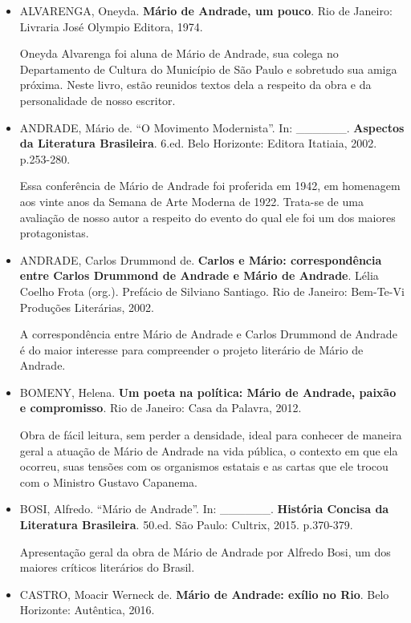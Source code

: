\documentclass[11pt]{extarticle}
\begin{document}
\begin{itemize}
\item  ALVARENGA, Oneyda. \textbf{Mário de Andrade, um pouco}. Rio de Janeiro:
Livraria José Olympio Editora, 1974.

Oneyda Alvarenga foi aluna de Mário de Andrade, sua colega no
Departamento de Cultura do Município de São Paulo e sobretudo sua amiga
próxima. Neste livro, estão reunidos textos dela a respeito da obra e da
personalidade de nosso escritor.

\item ANDRADE, Mário de. ``O Movimento Modernista''. In: \_\_\_\_\_\_.
\textbf{Aspectos da Literatura Brasileira}. 6.ed. Belo Horizonte:
Editora Itatiaia, 2002. p.253-280.

Essa conferência de Mário de Andrade foi proferida em 1942, em homenagem
aos vinte anos da Semana de Arte Moderna de 1922. Trata-se de uma
avaliação de nosso autor a respeito do evento do qual ele foi um dos
maiores protagonistas.

\item ANDRADE, Carlos Drummond de. \textbf{Carlos e Mário: correspondência
entre Carlos Drummond de Andrade e Mário de Andrade}. Lélia Coelho Frota
(org.). Prefácio de Silviano Santiago. Rio de Janeiro: Bem-Te-Vi
Produções Literárias, 2002.

A correspondência entre Mário de Andrade e Carlos Drummond de Andrade é
do maior interesse para compreender o projeto literário de Mário de
Andrade.

\item BOMENY, Helena. \textbf{Um poeta na política: Mário de Andrade, paixão e
compromisso}. Rio de Janeiro: Casa da Palavra, 2012.

Obra de fácil leitura, sem perder a densidade, ideal para conhecer de
maneira geral a atuação de Mário de Andrade na vida pública, o contexto
em que ela ocorreu, suas tensões com os organismos estatais e as cartas
que ele trocou com o Ministro Gustavo Capanema.

\item BOSI, Alfredo. ``Mário de Andrade''. In: \_\_\_\_\_\_. \textbf{História
Concisa da Literatura Brasileira}. 50.ed. São Paulo: Cultrix, 2015.
p.370-379.

Apresentação geral da obra de Mário de Andrade por Alfredo Bosi, um dos
maiores críticos literários do Brasil.

\item CASTRO, Moacir Werneck de. \textbf{Mário de Andrade: exílio no Rio}.
Belo Horizonte: Autêntica, 2016.


\end{itemize}
\end{document}
